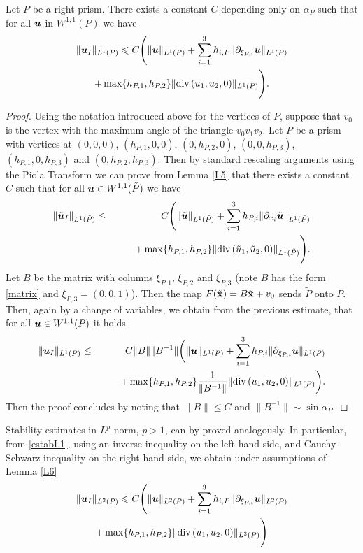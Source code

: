 \begin{lemma}\label{L6} Let $P$ be a right prism. There exists a constant $C$ depending only on $\alpha_P$ such that for all $\boldsymbol{u}$ in $W^{1,1}(P)$ we have
\begin{multline}\label{estabL1}
\|\boldsymbol{u}_I\|_{L^1(P)} \leqslant C\Bigg(\|\boldsymbol{u}\|_{L^1(P)} + \sum_{i=1}^3 h_{i,P}\|\partial_{\xi_{P,i}}\boldsymbol{u}\|_{L^1(P)}\\ + \max\{h_{P,1},h_{P,2}\}\|\mbox{div\,}(u_1,u_2,0)\|_{L^1(P)}\Bigg).
\end{multline}
\end{lemma}
\begin{proof} Using the notation introduced above for the vertices of $P$, suppose that $v_0$ is the vertex with the maximum angle of the triangle $v_0v_1v_2$. Let $\tilde P$ be a prism with vertices at $(0,0,0)$, $(h_{P,1},0,0)$, $(0,h_{P,2},0)$, $(0,0,h_{P,3})$, $(h_{P,1},0,h_{P,3})$ and $(0,h_{P,2},h_{P,3})$. Then by standard rescaling arguments using the Piola Transform we can prove from Lemma \eqref{L5} that there exists a constant $C$ such that for all $\boldsymbol{u}\in W^{1,1}(\tilde P)$ we have
\begin{eqnarray*}
\|\tilde{\boldsymbol{u}}_I\|_{L^1(\tilde P)}&\le& C\Bigg(\|\tilde{\boldsymbol{u}}\|_{L^1(\tilde P)} + \sum_{i=1}^3h_{P,i}\|\partial_{x_i}\tilde{\boldsymbol{u}}\|_{L^1(\tilde P)}\\&&\qquad + 
\max\{h_{P,1},h_{P,2}\}\|\mbox{div\,}(\tilde u_1,\tilde u_2,0)\|_{L^1(\tilde P)}\Bigg).
\end{eqnarray*}
Let $B$ be the matrix with columns $\xi_{P,1}$, $\xi_{P,2}$ and $\xi_{P,3}$ (note $B$ has the form \eqref{matrix} and $\xi_{P,3}=(0,0,1)$). Then the map $F(\tilde{\bf x})=B\tilde{\bf x}+v_0$ sends $\tilde P$ onto $P$. Then, again by a change of variables, we obtain from the previous estimate, that for all $\boldsymbol{u}\in W^{1,1}(P)$ it holds
\begin{eqnarray*}
\|\boldsymbol{u}_I\|_{L^1(P)}&\le& C\|B\|\|B^{-1}\|\bigg(\|\boldsymbol{u}\|_{L^1(P)} + \sum_{i=1}^3h_{P,i}\|\partial_{\xi_{P,i}}\boldsymbol{u}\|_{L^1(P)}\\ &&  \qquad +\max\{h_{P,1},h_{P,2}\}\frac1{\|B^{-1}\|}\|\mbox{div\,}(u_1,u_2,0)\|_{L^1(P)}\bigg). 
\end{eqnarray*}
Then the proof concludes by noting that $\|B\|\leqslant C$ and $\|B^{-1}\|\sim \sin\alpha_P$.
\end{proof}

\begin{remark} Stability estimates in $L^p$-norm, $p>1$, can by proved analogously. In particular, from  \eqref{estabL1}, using an inverse inequality on the left hand side, and Cauchy-Schwarz inequality on the right hand side, we obtain under assumptions of Lemma \ref{L6}
\begin{multline}\label{estabL2}
\|\boldsymbol{u}_I\|_{L^2(P)} \leqslant C\Bigg(\|\boldsymbol{u}\|_{L^2(P)} + \sum_{i=1}^3 h_{i,P}\|\partial_{\xi_{P,i}}\boldsymbol{u}\|_{L^2(P)}\\ + \max\{h_{P,1},h_{P,2}\}\|\mbox{div\,}(u_1,u_2,0)\|_{L^2(P)}\Bigg)
\end{multline}
\end{remark}

